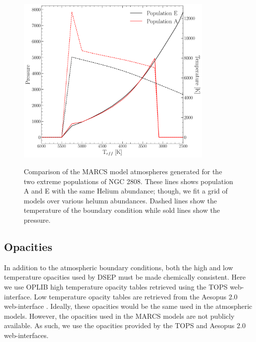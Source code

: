 \begin{figure}
	\centering
	\includegraphics[width=0.85\textwidth]{figures/ngc2808/notebookFigures/AtmosphereComparison.pdf}
	\label{fig:AEAtmComp}
	\caption{Comparison of the MARCS model atmospheres generated for the two
	extreme populations of NGC 2808. These lines shows population A and E with
	the same Helium abundance; though, we fit a grid of models over various
	helumn abundances. Dashed lines show the temperature of the boundary
	condition while sold lines show the pressure.}
\end{figure}


\subsection{Opacities}\label{sec:opac}
In addition to the atmospheric boundary conditions, both the high and low
temperature opacities used by DSEP must be made chemically consistent. Here we
use OPLIB high temperature opacity tables \citep{Colgan2016} retrieved using
the TOPS web-interface. Low temperature opacity tables are retrieved from the
Aesopus 2.0 web-interface \citep{Marigo2009, Marigo2022}. Ideally, these
opacities would be the same used in the atmospheric models. However, the
opacities used in the MARCS models are not publicly available. As such, we use
the opacities provided by the TOPS and Aesopus 2.0 web-interfaces.
